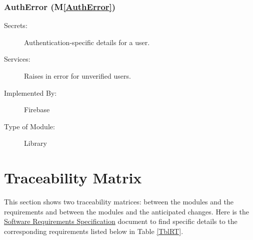 \documentclass[12pt, titlepage]{article}
\newcommand{\mref}[1]{M\ref{#1}}
\begin{document}
\subsubsection{AuthError (\mref{AuthError})}

\begin{description}
\item[Secrets:] Authentication-specific details for a user.
\item[Services:] Raises in error for unverified users.
\item[Implemented By:]  Firebase
\item[Type of Module:] Library
\end{description}






\section{Traceability Matrix} \label{SecTM}

This section shows two traceability matrices: between the modules and the
requirements and between the modules and the anticipated changes. Here is the \href{https://github.com/brandonduong/Farming-Matters/blob/main/docs/SRS/SRS.pdf}{Software Requirements Specification} document to find specific details to the corresponding requirements listed below in Table \ref{TblRT}.
\end{document}
